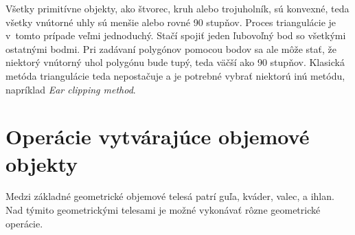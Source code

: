 Všetky primitívne objekty, ako štvorec, kruh alebo trojuholník, sú konvexné, teda všetky vnútorné uhly sú menšie alebo rovné 90 stupňov. Proces triangulácie je v~tomto prípade veľmi jednoduchý. Stačí spojiť jeden ľubovoľný bod so všetkými ostatnými bodmi. Pri zadávaní polygónov pomocou bodov sa ale môže stať, že niektorý vnútorný uhol polygónu bude tupý, teda väčší ako 90 stupňov. Klasická metóda triangulácie teda nepostačuje a je potrebné vybrať niektorú inú metódu, napríklad \textit{Ear clipping method}\cite{modernipocitacovagrafika}.















































\section{Operácie vytvárajúce objemové objekty}
Medzi základné geometrické objemové telesá patrí guľa, kváder, valec, a ihlan. Nad týmito geometrickými telesami je možné vykonávať rôzne geometrické operácie.





